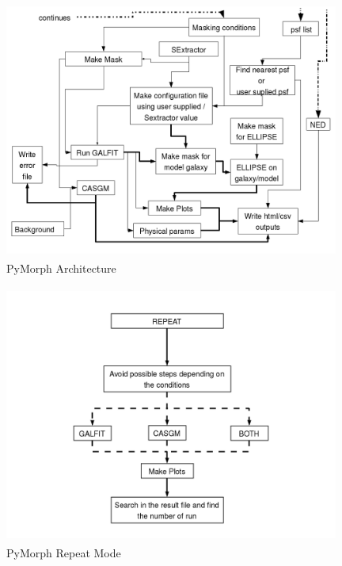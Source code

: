 \documentclass[a4paper,12pt]{article}
\begin{document}
\begin{figure}[tbh!]
 \centering
 \includegraphics[width=11cm, height=8.5cm, bb=0 0 794 596]{pipeline-arch3.png}
 \caption{PyMorph Architecture}
 \label{fig:arch3}
\end{figure}

\begin{figure}[tbh!]
 \centering
 \includegraphics[width=11cm, height=8.5cm, bb=0 0 794 596]{pipeline-arch4.png}
 \caption{PyMorph Repeat Mode}
 \label{fig:arch4}
\end{figure}
\end{document}
